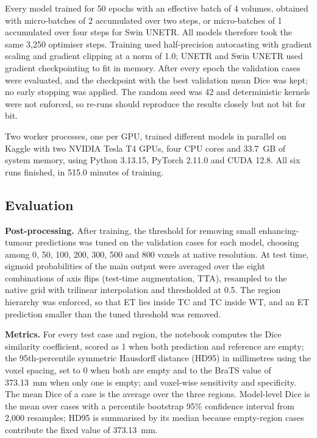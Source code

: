 \documentclass[a4paper,fleqn]{cas-sc}
\begin{document}
Every model trained for 50 epochs with an effective batch of 4 volumes, obtained with micro-batches of 2 accumulated over two steps, or micro-batches of 1 accumulated over four steps for Swin UNETR. All models therefore took the same 3,250 optimiser steps. Training used half-precision autocasting with gradient scaling and gradient clipping at a norm of 1.0; UNETR and Swin UNETR used gradient checkpointing to fit in memory. After every epoch the validation cases were evaluated, and the checkpoint with the best validation mean Dice was kept; no early stopping was applied. The random seed was 42 and deterministic kernels were not enforced, so re-runs should reproduce the results closely but not bit for bit.

Two worker processes, one per GPU, trained different models in parallel on Kaggle with two NVIDIA Tesla T4 GPUs, four CPU cores and 33.7~GB of system memory, using Python 3.13.15, PyTorch 2.11.0 and CUDA 12.8. All six runs finished, in 515.0 minutes of training.

\subsection{Evaluation}
\label{sec:evaluation}

\textbf{Post-processing.} After training, the threshold for removing small enhancing-tumour predictions was tuned on the validation cases for each model, choosing among 0, 50, 100, 200, 300, 500 and 800 voxels at native resolution. At test time, sigmoid probabilities of the main output were averaged over the eight combinations of axis flips (test-time augmentation, TTA), resampled to the native grid with trilinear interpolation and thresholded at 0.5. The region hierarchy was enforced, so that ET lies inside TC and TC inside WT, and an ET prediction smaller than the tuned threshold was removed.

\textbf{Metrics.} For every test case and region, the notebook computes the Dice similarity coefficient, scored as 1 when both prediction and reference are empty; the 95th-percentile symmetric Hausdorff distance (HD95) in millimetres using the voxel spacing, set to 0 when both are empty and to the BraTS value of 373.13~mm when only one is empty; and voxel-wise sensitivity and specificity. The mean Dice of a case is the average over the three regions. Model-level Dice is the mean over cases with a percentile bootstrap 95\% confidence interval from 2,000 resamples; HD95 is summarised by its median because empty-region cases contribute the fixed value of 373.13~mm.
\end{document}
